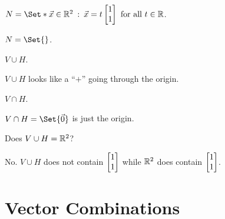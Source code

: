 \begin{slide}
\begin{parts}
\begin{solution}
		\end{solution}
		\item $N=\Set*{\vec x\in\R^2 \given \vec x=t\mat{1\\1}\text{ for all }t\in\R}$.
				\begin{solution}[inline]
			$N=\Set{}$.
		\end{solution}

		\item $V\cup H$.
			\begin{solution}[inline]
			$V\cup H$ looks like a ``$+$'' going through the origin.
		\end{solution}
		\item $V\cap H$.
			\begin{solution}[inline]
				$V\cap H=\Set{\vec 0}$ is just the origin.
		\end{solution}
		\item Does $V\cup H=\mathbb{R}^2$?
			\begin{solution}
				No. $V\cup H$ does not contain $\mat{1\\1}$ while $\mathbb{R}^2$ does contain
				$\mat{1\\1}$.
			\end{solution}
	\end{parts}
\end{slide}


	\begin{bookonly}\begin{center}\hspace{-2cm}\triplegrid\hspace{-2cm}\triplegrid\end{center}\end{bookonly}
	\bookonlynewpage
	\displayonlynewpage
\section*{Vector Combinations}
	\vspace{-1em}

